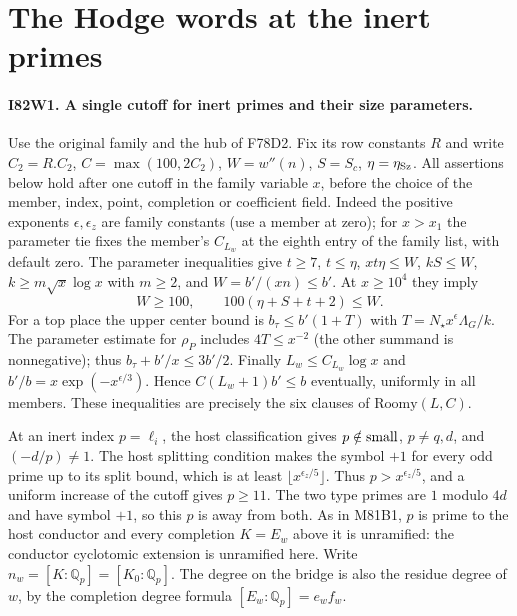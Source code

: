 \section{The Hodge words at the inert primes}

\paragraph{I82W1. A single cutoff for inert primes and their size parameters.}
Use the original family and the hub of F78D2. Fix its row constants
$R$ and write $C_2=R.C_2$, $C=\max(100,2C_2)$, $W=w''(n)$,
$S=S_c$, $\eta=\eta_{\rm Sz}$. All assertions below hold after
one cutoff in the family variable $x$, before the choice of the
member, index, point, completion or coefficient field. Indeed the
positive exponents $\epsilon,\epsilon_z$ are family constants (use
a member at zero); for $x>x_1$ the parameter tie fixes the member's
$C_{L_w}$ at the eighth entry of the family list, with default zero.
The parameter inequalities give $t\ge7$, $t\le\eta$,
$x t\eta\le W$, $kS\le W$, $k\ge m\sqrt{x}\log x$ with $m\ge2$,
and $W=b'/(xn)\le b'$. At $x\ge10^4$ they imply
\[
 W\ge100,\qquad 100(\eta+S+t+2)\le W .
\]
For a top place the upper center bound is
$b_\tau\le b'(1+T)$ with $T=N_\star x^\epsilon\Lambda_G/k$.
The parameter estimate for $\rho_P$ includes $4T\le x^{-2}$
(the other summand is nonnegative); thus $b_\tau+b'/x\le3b'/2$.
Finally $L_w\le C_{L_w}\log x$ and
$b'/b=x\exp(-x^{\epsilon/3})$. Hence
$C(L_w+1)b'\le b$ eventually, uniformly in all members.
These inequalities are precisely the six clauses of $\mathrm{Roomy}(L,C)$.

At an inert index $p=\ell_i$, the host classification gives
$p\notin{\rm small}$, $p\ne q,d$, and $(-d/p)\ne1$.
The host splitting condition makes the symbol $+1$ for every
odd prime up to its split bound, which is at least
$\lfloor x^{\epsilon_z/5}\rfloor$. Thus $p>x^{\epsilon_z/5}$,
and a uniform increase of the cutoff gives $p\ge11$.
The two type primes are $1$ modulo $4d$ and have symbol $+1$,
so this $p$ is away from both. As in M81B1, $p$ is prime to
the host conductor and every completion $K=E_w$ above it is
unramified: the conductor cyclotomic extension is unramified here.
Write $n_w=[K:\mathbb Q_p]=[K_0:\mathbb Q_p]$.
The degree on the bridge is also the residue degree of $w$,
by the completion degree formula $[E_w:\mathbb Q_p]=e_w f_w$.


